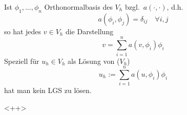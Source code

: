 \begin{bemerkung} %
    Ist  ${\phi_1, \dots, \phi_n}$ Orthonormalbasis des $V_h$ bzgl.\ $a(\cdot,\cdot)$, d.h.\ \\
    \[
        a(\phi_i,\phi_j) = \delta_{ij} \quad \forall i,j
    \]
    so hat jedes $v\in V_h$ die Darstellung
    \[
        v = \sum_{i=1}^{n} a(v,\phi_i)\phi_i
    \]
    Speziell für $u_h\in V_h$ als Lösung von ($V_h$)
    \[
        u_h:= \sum_{i=1}^{n} a(u, \phi_i)\phi_i
    \]
    hat man kein LGS zu lösen.
\end{bemerkung}<++>
